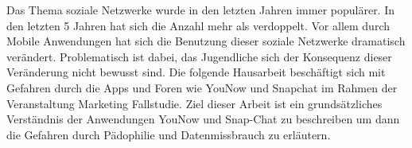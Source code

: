 Das Thema soziale Netzwerke wurde in den letzten Jahren immer populärer. In den
letzten 5 Jahren hat sich die Anzahl mehr als verdoppelt. Vor allem durch
Mobile Anwendungen hat sich die Benutzung dieser soziale Netzwerke dramatisch
verändert. Problematisch ist dabei, das Jugendliche sich der Konsequenz dieser
Veränderung nicht bewusst sind.  Die folgende Hausarbeit beschäftigt sich mit
Gefahren durch die Apps und Foren wie YouNow und Snapchat im Rahmen der
Veranstaltung Marketing Fallstudie. Ziel dieser Arbeit ist ein grundsätzliches
Verständnis der Anwendungen YouNow und Snap-Chat zu beschreiben um dann die
Gefahren durch Pädophilie und Datenmissbrauch zu erläutern.
